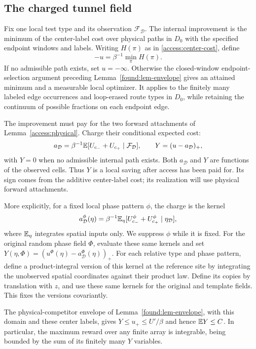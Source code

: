 \subsection{The charged tunnel field}\label{access:tunnels}

Fix one local test type and its observation $\mathcal F_{\mathcal D}$.
The internal improvement is the minimum of the center-label cost over
physical paths in $D_0$ with the specified endpoint windows and labels.
Writing $H(\pi)$ as in \eqref{access:center-cost}, define
\[
                    -u=\beta^{-1}\min_{\pi}H(\pi).
\]
If no admissible path exists, set $u=-\infty$. Otherwise the closed-window
endpoint-selection argument preceding Lemma~\ref{found:lem-envelope}
gives an attained minimum and a measurable local optimizer. It applies
to the finitely many labeled edge occurrences and loop-erased route
types in $D_0$, while retaining the continuum of possible fractions
on each endpoint edge.

The improvement must pay for the two forward attachments of
Lemma~\ref{access:physical}.  Charge their conditional expected cost:
\begin{equation}\label{access:charge}
 a_{\mathcal D}
   =\beta^{-1}\mathbb E[U_{c_-}+U_{c_+}\mid\mathcal F_{\mathcal D}],
 \qquad Y=(u-a_{\mathcal D})_+,
\end{equation}
with $Y=0$ when no admissible internal path exists.  Both
$a_{\mathcal D}$ and $Y$ are functions of the observed cells.  Thus $Y$
is a local saving after access has been paid for.  Its sign comes from
the additive center-label cost; its realization will use physical
forward attachments.

More explicitly, for a fixed local phase pattern $\phi$, the charge is
the kernel
\[
 a_{\mathcal D}^{\phi}(\eta)
 =\beta^{-1}\mathbb E_{\eta}
   [U_{c_-}^{\phi}+U_{c_+}^{\phi}\mid\eta_{\mathcal D}],
\]
where $\mathbb E_\eta$ integrates spatial inputs only. We suppress $\phi$
while it is fixed. For the original random phase field $\Phi$, evaluate
these same kernels and set
$Y(\eta,\Phi)=(u^{\Phi}(\eta)-a_{\mathcal D}^{\Phi}(\eta))_+$.
For each relative type and phase pattern, define a product-integral
version of this kernel at the reference site by integrating the
unobserved spatial coordinates against their product law. Define its
copies by translation with $z$, and use these same kernels for the
original and template fields. This fixes the versions covariantly.

The physical-competitor envelope of Lemma~\ref{found:lem-envelope},
with this domain and these center labels, gives
$Y\le u_+\le U'/\beta$ and hence $\mathbb E Y\le C$. In particular, the
maximum reward over any finite array is integrable, being bounded by
the sum of its finitely many $Y$ variables.

